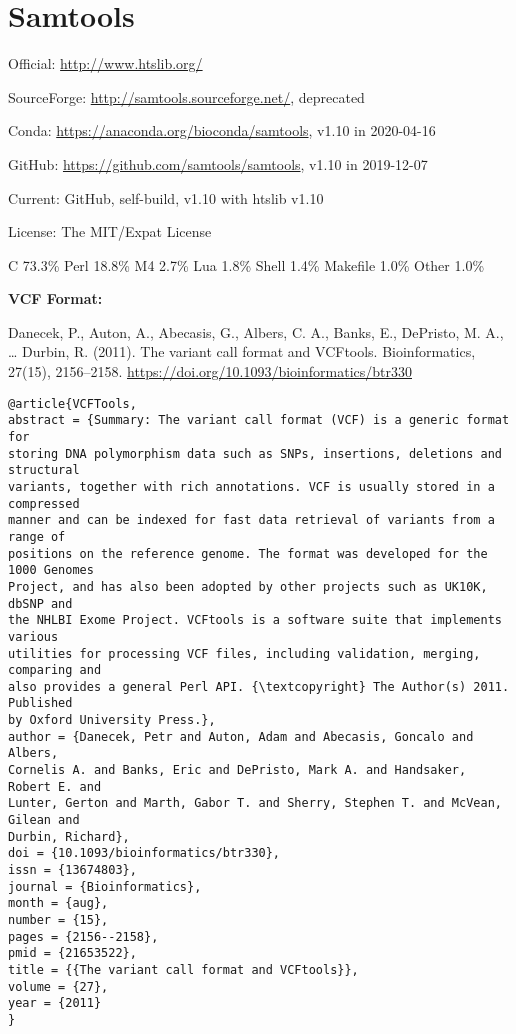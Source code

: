 \documentclass[]{article}
\begin{document}
\section{Samtools}

Official: \url{http://www.htslib.org/}

SourceForge: \url{http://samtools.sourceforge.net/}, deprecated

Conda: \url{https://anaconda.org/bioconda/samtools}, v1.10 in 2020-04-16

GitHub: \url{https://github.com/samtools/samtools}, v1.10 in 2019-12-07

Current: GitHub, self-build, v1.10 with htslib v1.10

License: The MIT/Expat License

C 73.3\% Perl 18.8\% M4 2.7\% Lua 1.8\% Shell 1.4\% Makefile 1.0\% Other 1.0\%

\textbf{VCF Format:}

Danecek, P., Auton, A., Abecasis, G., Albers, C. A., Banks, E., DePristo, M. A., … Durbin, R. (2011). The variant call format and VCFtools. Bioinformatics, 27(15), 2156–2158. \url{https://doi.org/10.1093/bioinformatics/btr330}

\begin{verbatim}
@article{VCFTools,
abstract = {Summary: The variant call format (VCF) is a generic format for
storing DNA polymorphism data such as SNPs, insertions, deletions and structural
variants, together with rich annotations. VCF is usually stored in a compressed
manner and can be indexed for fast data retrieval of variants from a range of
positions on the reference genome. The format was developed for the 1000 Genomes
Project, and has also been adopted by other projects such as UK10K, dbSNP and
the NHLBI Exome Project. VCFtools is a software suite that implements various
utilities for processing VCF files, including validation, merging, comparing and
also provides a general Perl API. {\textcopyright} The Author(s) 2011. Published
by Oxford University Press.},
author = {Danecek, Petr and Auton, Adam and Abecasis, Goncalo and Albers,
Cornelis A. and Banks, Eric and DePristo, Mark A. and Handsaker, Robert E. and
Lunter, Gerton and Marth, Gabor T. and Sherry, Stephen T. and McVean, Gilean and
Durbin, Richard},
doi = {10.1093/bioinformatics/btr330},
issn = {13674803},
journal = {Bioinformatics},
month = {aug},
number = {15},
pages = {2156--2158},
pmid = {21653522},
title = {{The variant call format and VCFtools}},
volume = {27},
year = {2011}
}
\end{verbatim}
\end{document}
